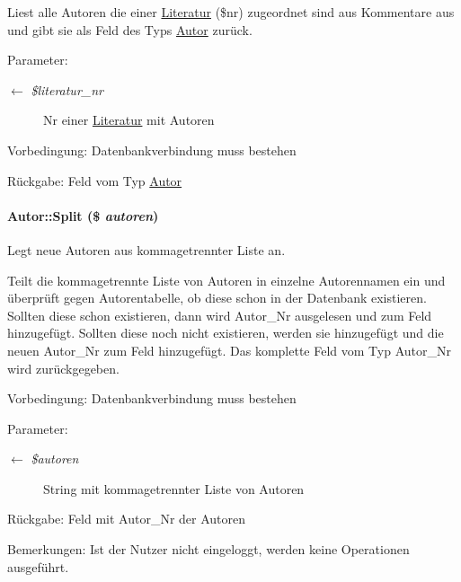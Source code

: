Liest alle Autoren die einer \hyperlink{classLiteratur}{Literatur} (\$nr) zugeordnet sind aus Kommentare aus und gibt sie als Feld des Typs \hyperlink{classAutor}{Autor} zurück. \begin{Desc}
\item[Parameter:]
\begin{description}
\item[\mbox{$\leftarrow$} {\em \$literatur\_\-nr}]Nr einer \hyperlink{classLiteratur}{Literatur} mit Autoren \end{description}
\end{Desc}
\begin{Desc}
\item[Vorbedingung:]Datenbankverbindung muss bestehen \end{Desc}
\begin{Desc}
\item[R\"{u}ckgabe:]Feld vom Typ \hyperlink{classAutor}{Autor} \end{Desc}
\hypertarget{classAutor_2ba5418b6622f414fa8a054e6c2a2db8}{
\paragraph[Split]{\setlength{\rightskip}{0pt plus 5cm}Autor::Split (\$ {\em autoren})}\hfill}
\label{classAutor_2ba5418b6622f414fa8a054e6c2a2db8}


Legt neue Autoren aus kommagetrennter Liste an. 

Teilt die kommagetrennte Liste von Autoren in einzelne Autorennamen ein und überprüft gegen Autorentabelle, ob diese schon in der Datenbank existieren. Sollten diese schon existieren, dann wird Autor\_\-Nr ausgelesen und zum Feld hinzugefügt. Sollten diese noch nicht existieren, werden sie hinzugefügt und die neuen Autor\_\-Nr zum Feld hinzugefügt. Das komplette Feld vom Typ Autor\_\-Nr wird zurückgegeben. \begin{Desc}
\item[Vorbedingung:]Datenbankverbindung muss bestehen \end{Desc}
\begin{Desc}
\item[Parameter:]
\begin{description}
\item[\mbox{$\leftarrow$} {\em \$autoren}]String mit kommagetrennter Liste von Autoren \end{description}
\end{Desc}
\begin{Desc}
\item[R\"{u}ckgabe:]Feld mit Autor\_\-Nr der Autoren \end{Desc}
\begin{Desc}
\item[Bemerkungen:]Ist der Nutzer nicht eingeloggt, werden keine Operationen ausgeführt. \end{Desc}


